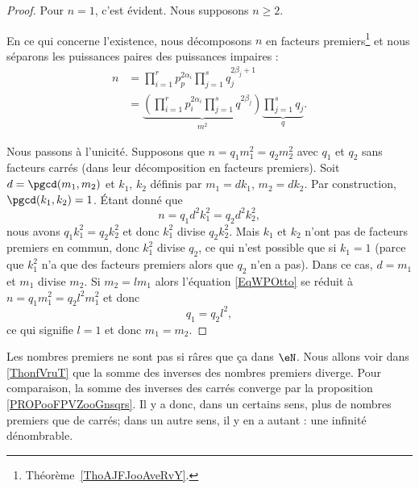 \begin{proof}
    Pour \( n=1\), c'est évident. Nous supposons \( n\geq 2\).

    En ce qui concerne l'existence, nous décomposons \( n\) en facteurs premiers\footnote{Théorème~\ref{ThoAJFJooAveRvY}.} et nous séparons les puissances paires des puissances impaires :
    \begin{subequations}
        \begin{align}
            n&=\prod_{i=1}^rp_p^{2\alpha_i}\prod_{j=1}^sq_{j}^{2\beta_j+1}\\
            &=\underbrace{\left( \prod_{i=1}^rp_i^{2\alpha_i}\prod_{j=1}^sq^{2\beta_j} \right)}_{m^2}\underbrace{\prod_{j=1}^sq_j}_{q}.
        \end{align}
    \end{subequations}

    Nous passons à l'unicité. Supposons que \( n=q_1m_1^2=q_2m_2^2\) avec \( q_1\) et \( q_2\) sans facteurs carrés (dans leur décomposition en facteurs premiers). Soit \( d=\pgcd(m_1,m_2)\) et \( k_1\), \( k_2\) définis par \( m_1=dk_1\), \( m_2=dk_2\). Par construction, \( \pgcd(k_1,k_2)=1\). Étant donné que
    \begin{equation}        \label{EqWPOtto}
        n=q_1d^2k_1^2=q_2d^2k_2^2,
    \end{equation}
    nous avons \( q_1k_1^2=q_2k_2^2\) et donc \( k_1^2\) divise \( q_2k_2^2\). Mais \( k_1\) et \( k_2\) n'ont pas de facteurs premiers en commun, donc \( k_1^2\) divise \( q_2\), ce qui n'est possible que si \( k_1=1\) (parce que \( k_1^2\) n'a que des facteurs premiers alors que \( q_2\) n'en a pas). Dans ce cas, \( d=m_1\) et \( m_1\) divise \( m_2\). Si \( m_2=lm_1\) alors l'équation \eqref{EqWPOtto} se réduit à  \( n=q_1m_1^2=q_2l^2m_1^2\) et donc
    \begin{equation}
        q_1=q_2l^2,
    \end{equation}
    ce qui signifie \( l=1\) et donc \( m_1=m_2\).
\end{proof}

Les nombres premiers ne sont pas si râres que ça dans \( \eN\). Nous allons voir dans \ref{ThonfVruT} que la somme des inverses des nombres premiers diverge. Pour comparaison, la somme des inverses des carrés converge par la proposition \ref{PROPooFPVZooGnsqrs}. Il y a donc, dans un certains sens, plus de nombres premiers que de carrés; dans un autre sens, il y en a autant : une infinité dénombrable.

